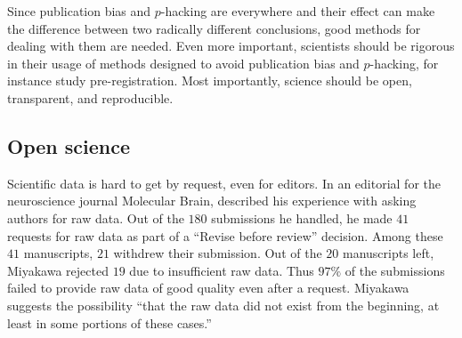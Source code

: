 Since publication bias and $p$-hacking are everywhere and their effect can make the difference between two radically different conclusions, good methods for dealing with them are needed. Even more important, scientists should be rigorous in their usage of methods designed to avoid publication bias and $p$-hacking, for instance study pre-registration. Most importantly, science should be open, transparent, and reproducible. 

\subsection{Open science}
\label{subsec:open science}
Scientific data is hard to get by request, even for editors. In an editorial for the neuroscience journal Molecular Brain, \textcite{Miyakawa2020-ze} described his experience with asking authors for raw data. Out of the $180$ submissions he handled, he made $41$ requests for raw data as part of a ``Revise before review'' decision. Among these $41$ manuscripts, $21$ withdrew their submission. Out of the $20$ manuscripts left, Miyakawa rejected $19$ due to insufficient raw data. Thus $97\%$ of the submissions failed to provide raw data of good quality even after a request. Miyakawa suggests the possibility ``that the raw data did not exist from the beginning, at least in some portions of these cases.''

